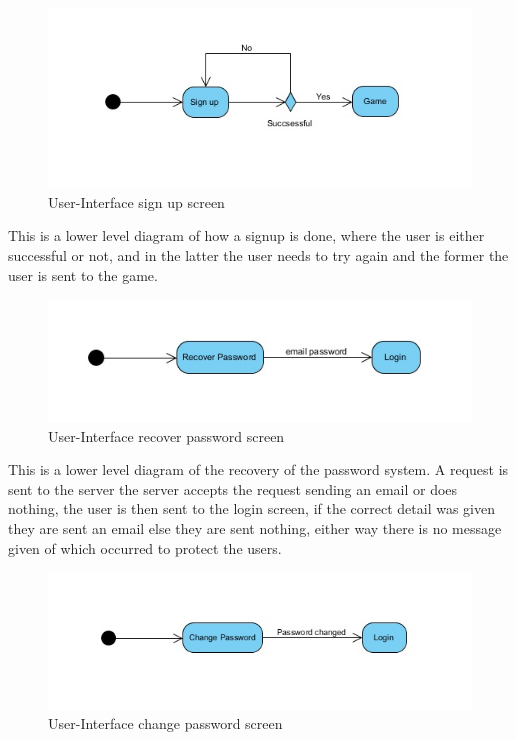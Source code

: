 \documentclass[letterpaper]{article}
\begin{document}
					\begin{figure}[H]
					\centering
					\includegraphics[width=180mm]{UML_Diagram/Activity/signup.jpg}
					\caption{User-Interface sign up screen}
					\label{overflow}
					\end{figure}
					This is a lower level diagram of how a signup is done, where the user is either successful or not, and in the latter the user needs to try again and the former the user is sent to the game.
					
					\begin{figure}[H]
					\centering
					\includegraphics[width=180mm]{UML_Diagram/Activity/recoverpassword.jpg}
					\caption{User-Interface recover password screen}
					\label{overflow}
					\end{figure}
					This is a lower level diagram of the recovery of the password system. A request is sent to the server the server accepts the request sending an email or does nothing, the user is then sent to the login screen, if the correct detail was given they are sent an email else they are sent nothing, either way there is no message given of which occurred to protect the users.
					
					\begin{figure}[H]
					\centering
					\includegraphics[width=180mm]{UML_Diagram/Activity/changepassword.jpg}
					\caption{User-Interface change password screen}
					\label{overflow}
					\end{figure}
					
\end{document}
